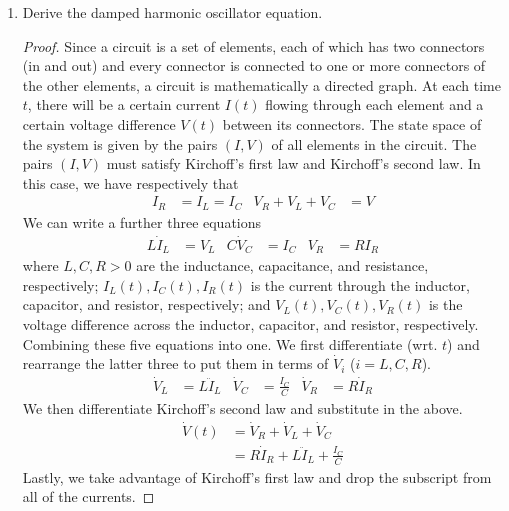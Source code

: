 \documentclass[../psets.tex]{subfiles}
\begin{document}
\begin{enumerate}
\begin{proof}
        It follows that a basis for the solution space is the two functions $\e[x_\pm t]$, so the general solution is
        \begin{equation*}
            y(t) = A\e[x_+t]+B\e[x_-t]
        \end{equation*}
    \end{proof}
    \item Derive the damped harmonic oscillator equation.
    \begin{proof}
        Since a circuit is a set of elements, each of which has two connectors (in and out) and every connector is connected to one or more connectors of the other elements, a circuit is mathematically a directed graph. At each time $t$, there will be a certain current $I(t)$ flowing through each element and a certain voltage difference $V(t)$ between its connectors. The state space of the system is given by the pairs $(I,V)$ of all elements in the circuit. The pairs $(I,V)$ must satisfy Kirchoff's first law and Kirchoff's second law. In this case, we have respectively that
        \begin{align*}
            I_R &= I_L = I_C&
            V_R+V_L+V_C &= V
        \end{align*}
        We can write a further three equations
        \begin{align*}
            L\dot{I}_L &= V_L&
            C\dot{V}_C &= I_C&
            V_R &= RI_R
        \end{align*}
        where $L,C,R>0$ are the inductance, capacitance, and resistance, respectively; $I_L(t),I_C(t),I_R(t)$ is the current through the inductor, capacitor, and resistor, respectively; and $V_L(t),V_C(t),V_R(t)$ is the voltage difference across the inductor, capacitor, and resistor, respectively. Combining these five equations into one. We first differentiate (wrt. $t$) and rearrange the latter three to put them in terms of $\dot{V}_i$ ($i=L,C,R$).
        \begin{align*}
            \dot{V}_L &= L\ddot{I}_L&
            \dot{V}_C &= \frac{I_C}{C}&
            \dot{V}_R &= R\dot{I}_R
        \end{align*}
        We then differentiate Kirchoff's second law and substitute in the above.
        \begin{align*}
            \dot{V}(t) &= \dot{V}_R+\dot{V}_L+\dot{V}_C\\
            &= R\dot{I}_R+L\ddot{I}_L+\frac{I_C}{C}
        \end{align*}
        Lastly, we take advantage of Kirchoff's first law and drop the subscript from all of the currents.

\end{proof}
\end{enumerate}
\end{document}
